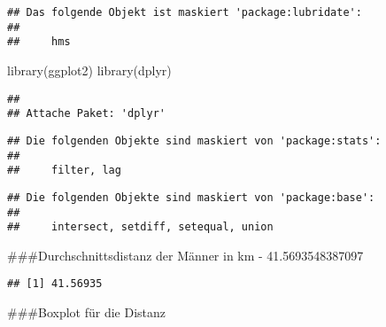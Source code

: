 \documentclass[
]{article}
\newenvironment{Shaded}{\begin{snugshade}}{\end{snugshade}}
\newcommand{\AttributeTok}[1]{\textcolor[rgb]{0.77,0.63,0.00}{#1}}
\newcommand{\ConstantTok}[1]{\textcolor[rgb]{0.00,0.00,0.00}{#1}}
\newcommand{\FunctionTok}[1]{\textcolor[rgb]{0.00,0.00,0.00}{#1}}
\newcommand{\NormalTok}[1]{#1}
\newcommand{\OtherTok}[1]{\textcolor[rgb]{0.56,0.35,0.01}{#1}}
\newcommand{\SpecialCharTok}[1]{\textcolor[rgb]{0.00,0.00,0.00}{#1}}
\newcommand{\StringTok}[1]{\textcolor[rgb]{0.31,0.60,0.02}{#1}}
\begin{document}
\begin{verbatim}
## Das folgende Objekt ist maskiert 'package:lubridate':
## 
##     hms
\end{verbatim}

\begin{Shaded}
\begin{Highlighting}[]
\FunctionTok{library}\NormalTok{(ggplot2)}
\FunctionTok{library}\NormalTok{(dplyr)}
\end{Highlighting}
\end{Shaded}

\begin{verbatim}
## 
## Attache Paket: 'dplyr'
\end{verbatim}

\begin{verbatim}
## Die folgenden Objekte sind maskiert von 'package:stats':
## 
##     filter, lag
\end{verbatim}

\begin{verbatim}
## Die folgenden Objekte sind maskiert von 'package:base':
## 
##     intersect, setdiff, setequal, union
\end{verbatim}

\#\#\#Durchschnittsdistanz der Männer in km - 41.5693548387097

\begin{Shaded}
\end{Shaded}

\begin{verbatim}
## [1] 41.56935
\end{verbatim}

\#\#\#Boxplot für die Distanz

\begin{Shaded}
\end{Shaded}
\end{document}
